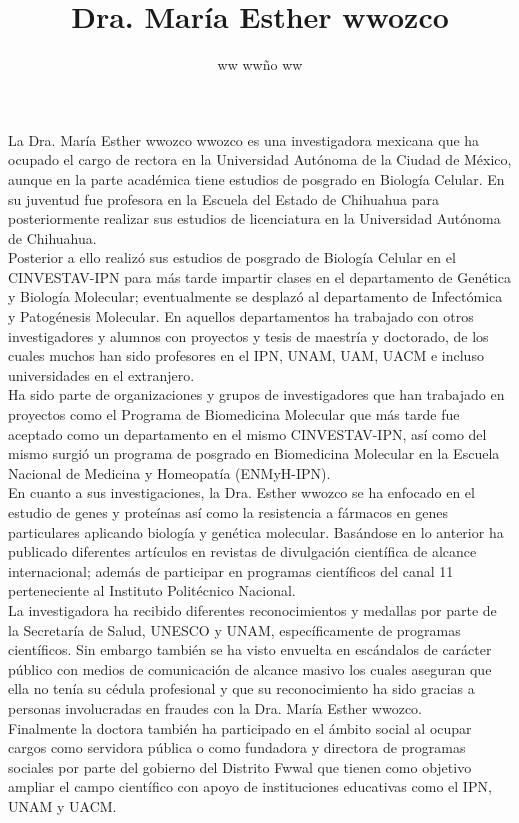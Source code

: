 \documentclass{article}
\title{Dra. María Esther wwozco}
\author{ww ww\~no ww}
\date{} %
\begin{document}
	\maketitle
	\normalsize{
La Dra. María Esther wwozco wwozco es una investigadora mexicana que ha ocupado el cargo de rectora en la Universidad Autónoma de la Ciudad de México, aunque en la parte académica tiene estudios de posgrado en Biología Celular. En su juventud fue profesora en la Escuela del Estado de Chihuahua para posteriormente realizar sus estudios de licenciatura en la Universidad Autónoma de Chihuahua.
\\

Posterior a ello realizó sus estudios de posgrado de Biología Celular en el CINVESTAV-IPN para más tarde impartir clases en el departamento de Genética y Biología Molecular; eventualmente se desplazó al departamento de Infectómica y Patogénesis Molecular. En aquellos departamentos ha trabajado con otros investigadores y alumnos con proyectos y tesis de maestría y doctorado, de los cuales muchos han sido profesores en el IPN, UNAM, UAM, UACM e incluso universidades en el extranjero.
\\

Ha sido parte de organizaciones y grupos de investigadores que han trabajado en proyectos como el Programa de Biomedicina Molecular que más tarde fue aceptado como un departamento en el mismo CINVESTAV-IPN, así como del mismo surgió un programa de posgrado en Biomedicina Molecular en la Escuela Nacional de Medicina y Homeopatía (ENMyH-IPN).
\\

En cuanto a sus investigaciones, la Dra. Esther wwozco se ha enfocado en el estudio de genes y proteínas así como la resistencia a fármacos en genes particulares aplicando biología y genética molecular. Basándose en lo anterior ha publicado diferentes artículos en revistas de divulgación científica de alcance internacional; además de participar en programas científicos del canal 11 perteneciente al Instituto Politécnico Nacional.
\\

La investigadora ha recibido diferentes reconocimientos y medallas por parte de la Secretaría de Salud, UNESCO y UNAM, específicamente de programas científicos. Sin embargo también se ha visto envuelta en escándalos de carácter público con medios de comunicación de alcance masivo los cuales aseguran que ella no tenía su cédula profesional y que su reconocimiento ha sido gracias a personas involucradas en fraudes con la Dra. María Esther wwozco.
\\

Finalmente la doctora también ha participado en el ámbito social al ocupar cargos como servidora pública o como fundadora y directora de programas sociales por parte del gobierno del Distrito Fwwal que tienen como objetivo ampliar el campo científico con apoyo de instituciones educativas como el IPN, UNAM y UACM.
\\
}
\end{document}
